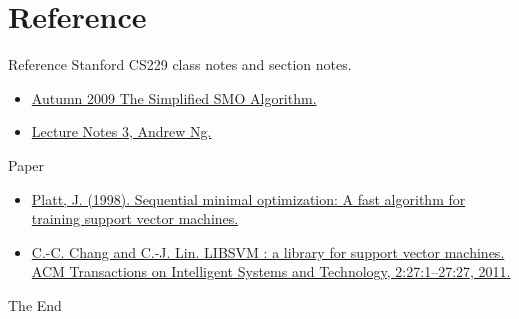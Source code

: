 \documentclass{beamer}
\begin{document}
\section{Reference}
    \begin{frame}{Reference}
    Stanford CS229 class notes and section notes.
    \begin{itemize}
        \item \href{http://cs229.stanford.edu/materials/smo.pdf}{Autumn 2009
        The Simplified SMO Algorithm.}
        \item \href{http://cs229.stanford.edu/notes-spring2019/cs229-notes3.pdf}{Lecture Notes 3, Andrew Ng.}
    \end{itemize}
    Paper
    \begin{itemize}
        \item \href{https://www.microsoft.com/en-us/research/wp-content/uploads/2016/02/tr-98-14.pdf}{Platt, J. (1998). Sequential minimal optimization: A fast algorithm for training support vector machines.}
        \item \href{https://www.csie.ntu.edu.tw/~cjlin/papers/libsvm.pdf}{C.-C. Chang and C.-J. Lin. LIBSVM : a library for support vector machines. ACM Transactions on Intelligent Systems and Technology, 2:27:1--27:27, 2011.}
    \end{itemize}
\end{frame}

\begin{frame}
    \Huge{\centerline{The End}}
\end{frame}
\end{document}
